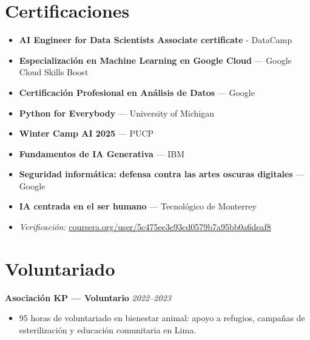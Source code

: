 \documentclass[a4paper,10pt]{article}
\begin{document}
\section*{Certificaciones}
\begin{itemize}[leftmargin=1.5em]

    \item \textbf{AI Engineer for Data Scientists Associate certificate} - DataCamp 
    \item \textbf{Especialización en Machine Learning en Google Cloud} — Google Cloud Skills Boost
    \item \textbf{Certificación Profesional en Análisis de Datos} — Google
    \item \textbf{Python for Everybody} — University of Michigan
    \item \textbf{Winter Camp AI 2025} — PUCP
    \item \textbf{Fundamentos de IA Generativa} — IBM
    \item \textbf{Seguridad informática: defensa contra las artes oscuras digitales} — Google
    \item \textbf{IA centrada en el ser humano} — Tecnológico de Monterrey
    \item \textit{Verificación:} \href{https://www.coursera.org/user/5c475ee3e93cd0579b7a95bb0a6deaf8}{coursera.org/user/5c475ee3e93cd0579b7a95bb0a6deaf8}
\end{itemize}


\section*{Voluntariado}
\textbf{Asociación KP — Voluntario} \hfill \textit{2022–2023}\\
\begin{itemize}[leftmargin=1.5em]
    \item 95 horas de voluntariado en bienestar animal: apoyo a refugios, campañas de esterilización y educación comunitaria en Lima.
\end{itemize}
\end{document}
